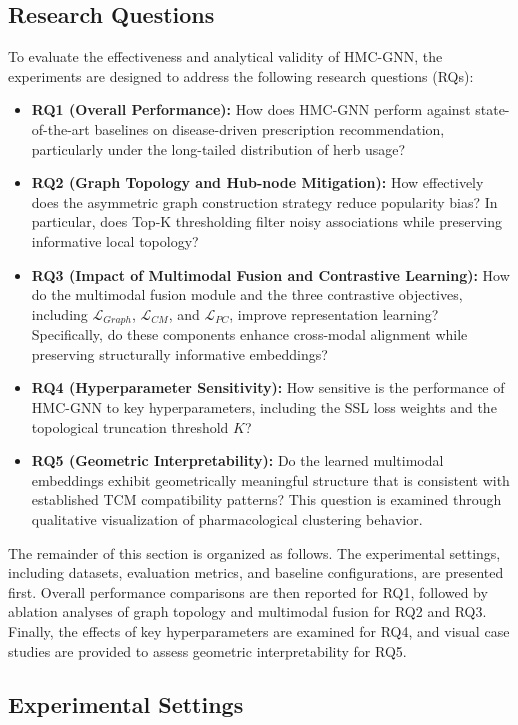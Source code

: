 \documentclass[a4paper,fleqn]{cas-dc}
\begin{document}
\subsection{Research Questions}
To evaluate the effectiveness and analytical validity of HMC-GNN, the experiments are designed to address the following research questions (RQs):
\begin{itemize}
    \item \textbf{RQ1 (Overall Performance):} How does HMC-GNN perform against state-of-the-art baselines on disease-driven prescription recommendation, particularly under the long-tailed distribution of herb usage?
    \item \textbf{RQ2 (Graph Topology and Hub-node Mitigation):} How effectively does the asymmetric graph construction strategy reduce popularity bias? In particular, does Top-K thresholding filter noisy associations while preserving informative local topology?
    \item \textbf{RQ3 (Impact of Multimodal Fusion and Contrastive Learning):} How do the multimodal fusion module and the three contrastive objectives, including $\mathcal{L}_{Graph}$, $\mathcal{L}_{CM}$, and $\mathcal{L}_{PC}$, improve representation learning? Specifically, do these components enhance cross-modal alignment while preserving structurally informative embeddings?
    \item \textbf{RQ4 (Hyperparameter Sensitivity):} How sensitive is the performance of HMC-GNN to key hyperparameters, including the SSL loss weights and the topological truncation threshold $K$?
    \item \textbf{RQ5 (Geometric Interpretability):} Do the learned multimodal embeddings exhibit geometrically meaningful structure that is consistent with established TCM compatibility patterns? This question is examined through qualitative visualization of pharmacological clustering behavior.
\end{itemize}

The remainder of this section is organized as follows. The experimental settings, including datasets, evaluation metrics, and baseline configurations, are presented first. Overall performance comparisons are then reported for RQ1, followed by ablation analyses of graph topology and multimodal fusion for RQ2 and RQ3. Finally, the effects of key hyperparameters are examined for RQ4, and visual case studies are provided to assess geometric interpretability for RQ5.

\subsection{Experimental Settings}
\end{document}
